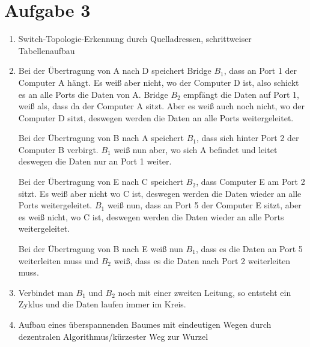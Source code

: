 \documentclass{article}
\begin{document}
	\section*{Aufgabe 3}
	\begin{enumerate}[label=(\alph*)]
		\item Switch-Topologie-Erkennung durch Quelladressen, schrittweiser Tabellenaufbau
		\item Bei der Übertragung von A nach D speichert Bridge $B_1$, dass an Port 1 der Computer A hängt. Es weiß aber nicht, wo der Computer D ist, also schickt es an alle Ports die Daten von A. Bridge $B_2$ empfängt die Daten auf Port 1, weiß als, dass da der Computer A sitzt. Aber es weiß auch noch nicht, wo der Computer D sitzt, deswegen werden die Daten an alle Ports weitergeleitet.
		
		Bei der Übertragung von B nach A speichert $B_1$, dass sich hinter Port 2 der Computer B verbirgt. $B_1$ weiß nun aber, wo sich A befindet und leitet deswegen die Daten nur an Port 1 weiter.
		
		Bei der Übertragung von E nach C speichert $B_2$, dass Computer E am Port 2 sitzt. Es weiß aber nicht wo C ist, deswegen werden die Daten wieder an alle Ports weitergeleitet. $B_1$ weiß nun, dass an Port 5 der Computer E sitzt, aber es weiß nicht, wo C ist, deswegen werden die Daten wieder an alle Ports weitergeleitet.
		
		Bei der Übertragung von B nach E weiß nun $B_1$, dass es die Daten an Port 5 weiterleiten muss und $B_2$ weiß, dass es die Daten nach Port 2 weiterleiten muss.
		\item Verbindet man $B_1$ und $B_2$ noch mit einer zweiten Leitung, so entsteht ein Zyklus und die Daten laufen immer im Kreis.
		\item Aufbau eines überspannenden Baumes mit eindeutigen Wegen durch dezentralen Algorithmus/kürzester Weg zur Wurzel
	\end{enumerate}
\end{document}
